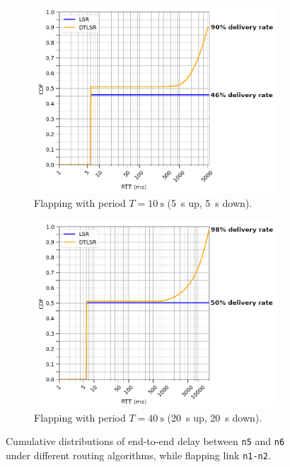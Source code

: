 \documentclass[withindex,glossary,openany]{cam-thesis}
\begin{document}
\begin{figure}
\centering
\begin{subfigure}{.8\textwidth}
  \centering
  \includegraphics[width=1\linewidth]{delay_partition_flap5}
  \caption{Flapping with period $T=\SI{10}{\s}$ (\SI{5}{\s} up, \SI{5}{\s} down).}
  \label{fig:partition_5}
\end{subfigure}

\begin{subfigure}{.8\textwidth}
  \centering
  \includegraphics[width=1\linewidth]{delay_partition_flap20}
  \caption{Flapping with period $T=\SI{40}{\s}$ (\SI{20}{\s} up, \SI{20}{\s} down).}
  \label{fig:partition_20}
\end{subfigure}
\caption{Cumulative distributions of end-to-end delay between \texttt{n5} and \texttt{n6} under different routing algorithms, while flapping link \texttt{n1-n2}.}
\label{fig:partition}
\end{figure}
\end{document}
